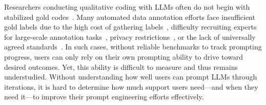 Researchers conducting qualitative coding with LLMs often do not begin with stabilized gold codes~\cite{dai2023llm,de2024further,gao2024collabcoder,zhang-etal-2024-glape, pang2023language}.
Many automated data annotation efforts face insufficient gold labels due to 
the high cost of gathering labels~\cite{wang2020learnability,liu2024zero}, %
difficulty recruiting experts for large-scale annotation tasks~\cite{caiafa2020decomposition, pais2024overcoming,wolf2023dealing}, %
privacy restrictions~\cite{hathurusinghe2021privacy, yao2023labeling}, or %
the lack of universally agreed standards~\cite{wang2024end, organisciak2014crowd}. %
In such cases, without reliable benchmarks to track prompting progress, users can only rely on their own prompting ability to drive toward desired outcomes.
Yet, this ability is difficult to measure and thus remains understudied.
Without understanding how well users can prompt LLMs through iterations, it is hard to determine how much support users need---and when they need it---to improve their prompt engineering efforts effectively.



